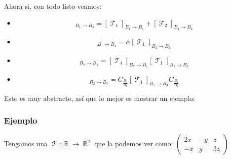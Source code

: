 \documentclass[12pt]{report}                                    %
\DeclareMathOperator \Real {\mathbb{R}}
\DeclareMathOperator \LinealTransformation {\mathcal{T}}
\begin{document}
            Ahora si, con todo listo veamos:
            \begin{itemize}
                \item \begin{equation*}
                        [\LinealTransformation_1 + \LinealTransformation_2]_{B_1 \to B_4} = 
                            [\LinealTransformation_1]_{B_1 \to B_4}
                            +
                            [\LinealTransformation_2]_{B_1 \to B_4}
                    \end{equation*}
                
                \item \begin{equation*}
                        [\alpha \LinealTransformation_1]_{B_1 \to B_4} = 
                            \alpha [\LinealTransformation_1]_{B_1 \to B_4}
                    \end{equation*}

                \item \begin{equation*}
                        [\LinealTransformation_4 \circ \LinealTransformation_1]_{B_7 \to B_1} = 
                            [\LinealTransformation_4]_{B_7 \to B_1}
                            [\LinealTransformation_1]_{B_1 \to B_7}
                    \end{equation*}

                \item\begin{equation*}
                        [\LinealTransformation_1]_{B_2 \to B_5} = 
                            C_{\frac{B_5}{B_4}}
                            [\LinealTransformation_1]_{B_1 \to B_4}
                            C_{\frac{B_1}{B_2}}
                    \end{equation*}

            \end{itemize}


        Esto es muy abstracto, así que lo mejor es mostrar un ejemplo:


            \clearpage
            \subsubsection{Ejemplo}

            Tengamos una $\LinealTransformation : \Real \to \Real^2$  que la podemos ver como:
            $\begin{pmatrix} 2x&-y&z\\-x&y&3z\end{pmatrix}$
\end{document}
